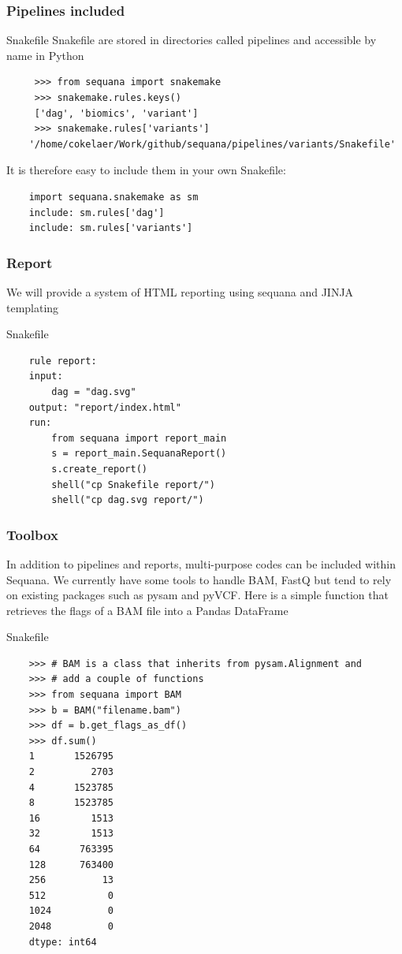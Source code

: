 \documentclass{beamer}
\begin{document}
\begin{frame}[fragile]
    \frametitle{Pipelines included}
    
    \begin{block}{Snakefile}
    Snakefile are stored in directories called pipelines and accessible by name in Python
    \begin{lstlisting}
     >>> from sequana import snakemake
     >>> snakemake.rules.keys()
     ['dag', 'biomics', 'variant']
     >>> snakemake.rules['variants']
    '/home/cokelaer/Work/github/sequana/pipelines/variants/Snakefile'
    \end{lstlisting}

    It is therefore easy to include them in your own Snakefile:
    \begin{lstlisting}
    import sequana.snakemake as sm
    include: sm.rules['dag']
    include: sm.rules['variants']
    \end{lstlisting}

    \end{block}
\end{frame}

\begin{frame}[fragile]
    \frametitle{Report}
    
    We will provide a system of HTML reporting using sequana and JINJA templating
    \begin{block}{Snakefile}
    \begin{lstlisting}
    rule report:
    input:
        dag = "dag.svg"
    output: "report/index.html"
    run:
        from sequana import report_main
        s = report_main.SequanaReport()
        s.create_report()
        shell("cp Snakefile report/")
        shell("cp dag.svg report/")    
    \end{lstlisting}
    \end{block}
\end{frame}


\begin{frame}[fragile]
    \frametitle{Toolbox}
    
    \footnotesize
    In addition to pipelines and reports, multi-purpose codes can be included within Sequana. 
    We currently have some tools to handle BAM, FastQ but tend to rely on existing packages such as pysam and pyVCF.
    Here is a simple function that retrieves the flags of a BAM file into a Pandas DataFrame
    
    \begin{block}{Snakefile}
    \begin{lstlisting}
    >>> # BAM is a class that inherits from pysam.Alignment and 
    >>> # add a couple of functions
    >>> from sequana import BAM
    >>> b = BAM("filename.bam")
    >>> df = b.get_flags_as_df()
    >>> df.sum()
    1       1526795
    2          2703
    4       1523785
    8       1523785
    16         1513
    32         1513
    64       763395
    128      763400
    256          13
    512           0
    1024          0
    2048          0
    dtype: int64
    \end{lstlisting}
    \end{block}
\end{frame}
\end{document}
